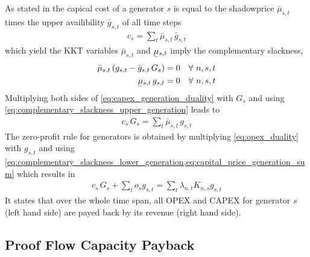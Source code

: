 \documentclass[11pt,twocolumn]{article}
\newcommand{\ubar}[1]{\underaccent{\bar}{#1}}
\newcommand{\Forall}[1]{\hspace{10pt} \forall \,\, #1 }
\newcommand{\generation}{g_{s,t}}
\newcommand{\generationpotential}{\bar{g}_{s,t}}
\newcommand{\capacitygeneration}{G_{s}}
\newcommand{\capitalpricegeneration}{c_{s}}
\newcommand{\operationalpricegeneration}{o_{s}}
\newcommand{\incidencegenerator}[1][n]{K_{#1,s}}
\newcommand{\mulowergeneration}{\ubar{\mu}_{s,t}}
\newcommand{\muuppergeneration}{\bar{\mu}_{s,t}}
\newcommand{\lmp}[1][n]{\lambda_{#1,t}}
\begin{document}
As stated in \cite{brown_decreasing_2020} the capical cost of a generator $s$ is equal to the shadowprice $\muuppergeneration$ times the upper availibility $\generationpotential$ of all time steps 
\begin{align}
 \capitalpricegeneration  = \sum_t \muuppergeneration \, \generationpotential 
 \label{eq:capital_price_generation_sum}
\end{align}
 which yield the KKT variables $\muuppergeneration$ and $\mulowergeneration$ imply the complementary slackness,
\begin{align}
\muuppergeneration \left( \generation - \generationpotential \, \capacitygeneration \right)  &= 0  \Forall{n,s,t} 
\label{eq:complementary_slackness_upper_generation} \\
\mulowergeneration  \, \generation &= 0 \Forall{n,s,t}
\label{eq:complementary_slackness_lower_generation} 
\end{align}
Multiplying both sides of \cref{eq:capex_generation_duality} with $\capacitygeneration$ and using \cref{eq:complementary_slackness_upper_generation} leads to 
\begin{align}
 \capitalpricegeneration \, \capacitygeneration  = \sum_t \muuppergeneration \, \generation 
 \label{eq:capital_price_generation_sum}
\end{align}
The zero-profit rule for generators is obtained by multiplying \cref{eq:opex_duality} with $\generation$ and using \cref{eq:complementary_slackness_lower_generation,eq:capital_price_generation_sum} which results in 
\begin{align}
  \capitalpricegeneration \, \capacitygeneration + \sum_t \operationalpricegeneration \generation = \sum_t \lmp \incidencegenerator \generation
\end{align}
It states that over the whole time span, all OPEX and CAPEX for generator $s$ (left hand side) are payed back by its revenue (right hand side).

\subsection{Proof Flow Capacity Payback}
\label{sec:zero_profit_flow}
\end{document}
